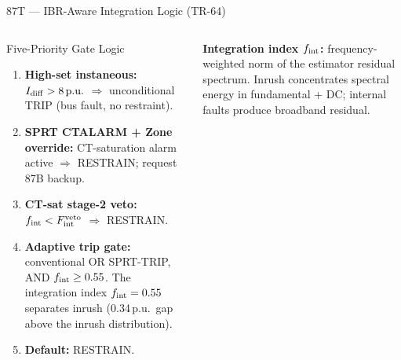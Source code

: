 \documentclass[aspectratio=169, 10pt]{beamer}
\newcommand{\pu}{\,\text{p.u.}}
\begin{document}
\begin{frame}{87T — IBR-Aware Integration Logic (TR-64)}
\begin{columns}[t]
\begin{block}{Five-Priority Gate Logic}
\footnotesize
\begin{enumerate}\setlength\itemsep{3pt}
  \item[\textbf{P1}] \textbf{High-set instaneous:}
    $I_{\rm diff} > 8\pu$ $\Rightarrow$ unconditional TRIP (bus fault, no restraint).
  \item[\textbf{P2}] \textbf{SPRT CTALARM + Zone override:}
    CT-saturation alarm active $\Rightarrow$ RESTRAIN; request 87B backup.
  \item[\textbf{P3}] \textbf{CT-sat stage-2 veto:}
    $f_{\rm int} < F_{\rm int}^{\rm veto}$ $\Rightarrow$ RESTRAIN.
  \item[\textbf{P4}] \textbf{Adaptive trip gate:}
    conventional OR SPRT-TRIP, AND $f_{\rm int} \geq 0.55$.
    The integration index $f_{\rm int} = 0.55$ separates inrush
    (0.34\,p.u.\ gap above the inrush distribution).
  \item[\textbf{P5}] \textbf{Default:} RESTRAIN.
\end{enumerate}
\end{block}
\vspace{4pt}
\begin{tcolorbox}[keybox]
\footnotesize
\textbf{Integration index $f_{\rm int}$:}
frequency-weighted norm of the estimator residual spectrum.
Inrush concentrates spectral energy in fundamental + DC;
internal faults produce broadband residual.
\end{tcolorbox}


\end{columns}
\end{frame}
\end{document}
